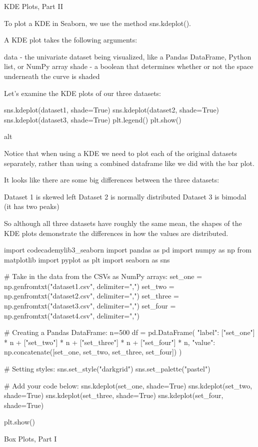 \documentclass{journal}
\begin{document}
KDE Plots, Part II

To plot a KDE in Seaborn, we use the method sns.kdeplot().

A KDE plot takes the following arguments:

    data - the univariate dataset being visualized, like a Pandas DataFrame, Python list, or NumPy array
    shade - a boolean that determines whether or not the space underneath the curve is shaded

Let’s examine the KDE plots of our three datasets:

sns.kdeplot(dataset1, shade=True)
sns.kdeplot(dataset2, shade=True)
sns.kdeplot(dataset3, shade=True)
plt.legend()
plt.show()

alt

Notice that when using a KDE we need to plot each of the original datasets separately, rather than using a combined dataframe like we did with the bar plot.

It looks like there are some big differences between the three datasets:

    Dataset 1 is skewed left
    Dataset 2 is normally distributed
    Dataset 3 is bimodal (it has two peaks)

So although all three datasets have roughly the same mean, the shapes of the KDE plots demonstrate the differences in how the values are distributed.



import codecademylib3_seaborn
import pandas as pd
import numpy as np
from matplotlib import pyplot as plt
import seaborn as sns

# Take in the data from the CSVs as NumPy arrays:
set_one = np.genfromtxt("dataset1.csv", delimiter=",")
set_two = np.genfromtxt("dataset2.csv", delimiter=",")
set_three = np.genfromtxt("dataset3.csv", delimiter=",")
set_four = np.genfromtxt("dataset4.csv", delimiter=",")

# Creating a Pandas DataFrame:
n=500
df = pd.DataFrame({
    "label": ["set_one"] * n + ["set_two"] * n + ["set_three"] * n + ["set_four"] * n,
    "value": np.concatenate([set_one, set_two, set_three, set_four])
})

# Setting styles:
sns.set_style("darkgrid")
sns.set_palette("pastel")

# Add your code below:
sns.kdeplot(set_one, shade=True)
sns.kdeplot(set_two, shade=True)
sns.kdeplot(set_three, shade=True)
sns.kdeplot(set_four, shade=True)

plt.show()


Box Plots, Part I
\end{document}
